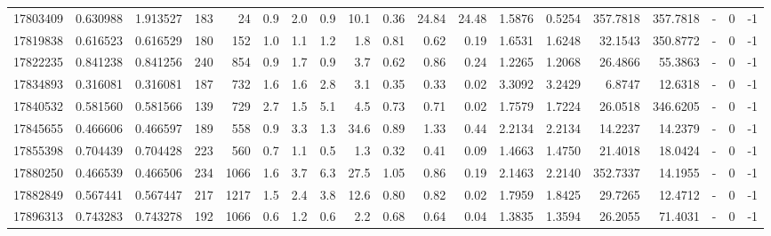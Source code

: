 \begin{tabular}{rrrrrrrrrrrrrrrrlrr}
  17803409 & 0.630988 &   1.913527 &  183 &   24 &      0.9 &      2.0 &     0.9 &     10.1 &       0.36 &       24.84 &       24.48 &  1.5876 &  0.5254 &  357.7818 &  357.7818 &             - &        0 &         -1 \\
  17819838 & 0.616523 &   0.616529 &  180 &  152 &      1.0 &      1.1 &     1.2 &      1.8 &       0.81 &        0.62 &        0.19 &  1.6531 &  1.6248 &   32.1543 &  350.8772 &             - &        0 &         -1 \\
  17822235 & 0.841238 &   0.841256 &  240 &  854 &      0.9 &      1.7 &     0.9 &      3.7 &       0.62 &        0.86 &        0.24 &  1.2265 &  1.2068 &   26.4866 &   55.3863 &             - &        0 &         -1 \\
  17834893 & 0.316081 &   0.316081 &  187 &  732 &      1.6 &      1.6 &     2.8 &      3.1 &       0.35 &        0.33 &        0.02 &  3.3092 &  3.2429 &    6.8747 &   12.6318 &             - &        0 &         -1 \\
  17840532 & 0.581560 &   0.581566 &  139 &  729 &      2.7 &      1.5 &     5.1 &      4.5 &       0.73 &        0.71 &        0.02 &  1.7579 &  1.7224 &   26.0518 &  346.6205 &             - &        0 &         -1 \\
  17845655 & 0.466606 &   0.466597 &  189 &  558 &      0.9 &      3.3 &     1.3 &     34.6 &       0.89 &        1.33 &        0.44 &  2.2134 &  2.2134 &   14.2237 &   14.2379 &             - &        0 &         -1 \\
  17855398 & 0.704439 &   0.704428 &  223 &  560 &      0.7 &      1.1 &     0.5 &      1.3 &       0.32 &        0.41 &        0.09 &  1.4663 &  1.4750 &   21.4018 &   18.0424 &             - &        0 &         -1 \\
  17880250 & 0.466539 &   0.466506 &  234 & 1066 &      1.6 &      3.7 &     6.3 &     27.5 &       1.05 &        0.86 &        0.19 &  2.1463 &  2.2140 &  352.7337 &   14.1955 &             - &        0 &         -1 \\
  17882849 & 0.567441 &   0.567447 &  217 & 1217 &      1.5 &      2.4 &     3.8 &     12.6 &       0.80 &        0.82 &        0.02 &  1.7959 &  1.8425 &   29.7265 &   12.4712 &             - &        0 &         -1 \\
  17896313 & 0.743283 &   0.743278 &  192 & 1066 &      0.6 &      1.2 &     0.6 &      2.2 &       0.68 &        0.64 &        0.04 &  1.3835 &  1.3594 &   26.2055 &   71.4031 &             - &        0 &         -1 \\

\end{tabular}
